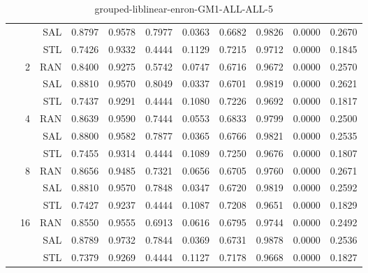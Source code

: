 \begin{center}
\begin{table}[htbp]
\begin{tabular}{ | r | r | r | r | r | r | r | r | r | r | r |}
 &   & SAL & 0.8797 & 0.9578 & 0.7977 & 0.0363 & 0.6682 & 0.9826 & 0.0000 & 0.2670\\ \cline{3-11}
 &   & STL & 0.7426 & 0.9332 & 0.4444 & 0.1129 & 0.7215 & 0.9712 & 0.0000 & 0.1845\\ \cline{2-11}
 & \multirow{3}{*}{2} & RAN & 0.8400 & 0.9275 & 0.5742 & 0.0747 & 0.6716 & 0.9672 & 0.0000 & 0.2570\\ \cline{3-11}
 &   & SAL & 0.8810 & 0.9570 & 0.8049 & 0.0337 & 0.6701 & 0.9819 & 0.0000 & 0.2621\\ \cline{3-11}
 &   & STL & 0.7437 & 0.9291 & 0.4444 & 0.1080 & 0.7226 & 0.9692 & 0.0000 & 0.1817\\ \cline{2-11}
 & \multirow{3}{*}{4} & RAN & 0.8639 & 0.9590 & 0.7444 & 0.0553 & 0.6833 & 0.9799 & 0.0000 & 0.2500\\ \cline{3-11}
 &   & SAL & 0.8800 & 0.9582 & 0.7877 & 0.0365 & 0.6766 & 0.9821 & 0.0000 & 0.2535\\ \cline{3-11}
 &   & STL & 0.7455 & 0.9314 & 0.4444 & 0.1089 & 0.7250 & 0.9676 & 0.0000 & 0.1807\\ \cline{2-11}
 & \multirow{3}{*}{8} & RAN & 0.8656 & 0.9485 & 0.7321 & 0.0656 & 0.6705 & 0.9760 & 0.0000 & 0.2671\\ \cline{3-11}
 &   & SAL & 0.8810 & 0.9570 & 0.7848 & 0.0347 & 0.6720 & 0.9819 & 0.0000 & 0.2592\\ \cline{3-11}
 &   & STL & 0.7427 & 0.9237 & 0.4444 & 0.1087 & 0.7208 & 0.9651 & 0.0000 & 0.1829\\ \cline{2-11}
 & \multirow{3}{*}{16} & RAN & 0.8550 & 0.9555 & 0.6913 & 0.0616 & 0.6795 & 0.9744 & 0.0000 & 0.2492\\ \cline{3-11}
 &   & SAL & 0.8789 & 0.9732 & 0.7844 & 0.0369 & 0.6731 & 0.9878 & 0.0000 & 0.2536\\ \cline{3-11}
 &   & STL & 0.7379 & 0.9269 & 0.4444 & 0.1127 & 0.7178 & 0.9668 & 0.0000 & 0.1827\\ \cline{2-11}
\hline
\end{tabular}
\caption{grouped-liblinear-enron-GM1-ALL-ALL-5}
\end{table}
\end{center}

